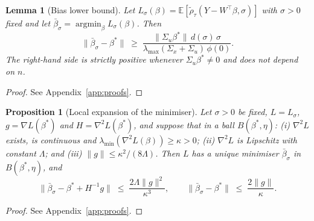 \documentclass[12pt,a4paper]{article}
\newtheorem{lemma}[theorem]{Lemma}
\newtheorem{proposition}[theorem]{Proposition}
\theoremstyle{definition}
\theoremstyle{remark}
\newcommand{\E}{\mathbb{E}}
\newcommand{\norm}[1]{\|#1\|}
\newcommand{\argmin}{\mathop{\mathrm{argmin}}}
\newcommand{\rht}{\tilde{\rho}_\tau}
\newcommand{\betas}{\beta^*}
\newcommand{\bbar}{\bar{\beta}}
\begin{document}
\begin{lemma}[Bias lower bound]
\label{lem:bias}
Let $L_\sigma(\beta) = \E[\rht(Y-W^\top\beta,\sigma)]$ with $\sigma>0$ fixed and let
$\bbar_\sigma = \argmin_\beta L_\sigma(\beta)$. Then
\begin{equation}
\norm{\bbar_\sigma-\betas}
\;\ge\;
\frac{\norm{\Sigma_u\betas}\,d(\sigma)\,\sigma}
     {\lambda_{\max}(\Sigma_x+\Sigma_u)\,\phi(0)} .
\label{eq:bias-lb}
\end{equation}
The right-hand side is strictly positive whenever $\Sigma_u\betas\neq0$ and does not
depend on $n$.
\end{lemma}

\begin{proof}
See Appendix~\ref{app:proofs}.
\end{proof}

\begin{proposition}[Local expansion of the minimiser]
\label{prop:target}
Let $\sigma>0$ be fixed, $L=L_\sigma$, $g=\nabla L(\betas)$ and $H=\nabla^2L(\betas)$, and
suppose that in a ball $B(\betas,\eta)$: (i) $\nabla^2L$ exists, is continuous and
$\lambda_{\min}(\nabla^2L(\beta))\ge\kappa>0$; (ii) $\nabla^2L$ is Lipschitz with constant
$\Lambda$; and (iii) $\|g\|\le\kappa^2/(8\Lambda)$. Then $L$ has a unique minimiser
$\bbar_\sigma$ in $B(\betas,\eta)$, and
\begin{equation}
\big\|\bbar_\sigma-\betas+H^{-1}g\big\| \;\le\; \frac{2\Lambda\|g\|^2}{\kappa^3},
\qquad
\norm{\bbar_\sigma-\betas} \;\le\; \frac{2\norm{g}}{\kappa}.
\label{eq:expansion}
\end{equation}
\end{proposition}

\begin{proof}
See Appendix~\ref{app:proofs}.
\end{proof}
\end{document}
